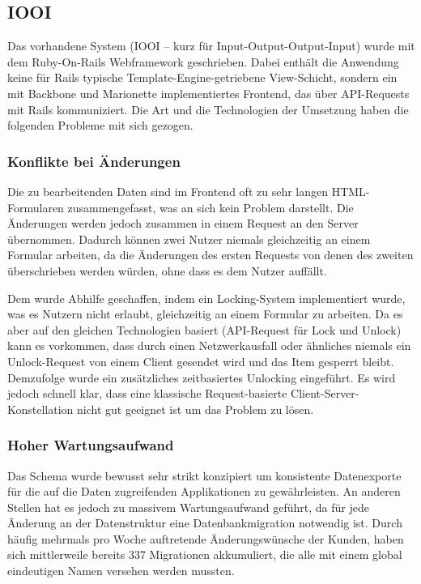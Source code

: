 \subsection{IOOI}
\label{ssec:ep_iooi}

Das vorhandene System (IOOI -- kurz für Input-Output-Output-Input) wurde mit
dem Ruby-On-Rails Webframework geschrieben.  Dabei enthält die Anwendung keine
für Rails typische Template-Engine-getriebene View-Schicht, sondern ein mit
Backbone und Marionette \cite{marionette} implementiertes Frontend, das über
API-Requests mit Rails kommuniziert.  Die Art und die Technologien der Umsetzung
haben die folgenden Probleme mit sich gezogen.

\subsubsection{Konflikte bei Änderungen}
\label{sssec:epv_konflikte_bei_aenderungen}

Die zu bearbeitenden Daten sind im Frontend oft zu sehr langen HTML-Formularen
zusammengefasst, was an sich kein Problem darstellt.  Die Änderungen werden
jedoch zusammen in einem Request an den Server übernommen.  Dadurch können zwei
Nutzer niemals gleichzeitig an einem Formular arbeiten, da die Änderungen des
ersten Requests von denen des zweiten überschrieben werden würden, ohne dass es
dem Nutzer auffällt.

Dem wurde Abhilfe geschaffen, indem ein Locking-System implementiert wurde, was
es Nutzern nicht erlaubt, gleichzeitig an einem Formular zu arbeiten.  Da es
aber auf den gleichen Technologien basiert (API-Request für Lock und Unlock)
kann es vorkommen, dass durch einen Netzwerkausfall oder ähnliches niemals ein
Unlock-Request von einem Client gesendet wird und das Item gesperrt bleibt.
Demzufolge wurde ein zusätzliches zeitbasiertes Unlocking eingeführt.  Es wird
jedoch schnell klar, dass eine klassische Request-basierte
Client-Server-Konstellation nicht gut geeignet ist um das Problem zu lösen.

\subsubsection{Hoher Wartungsaufwand}
\label{sssec:epv_hoher_wartungsaufwand}

Das Schema wurde bewusst sehr strikt konzipiert um konsistente Datenexporte für
die auf die Daten zugreifenden Applikationen zu gewährleisten.  An anderen
Stellen hat es jedoch zu massivem Wartungsaufwand geführt, da für jede Änderung
an der Datenstruktur eine Datenbankmigration notwendig ist.  Durch häufig
mehrmals pro Woche auftretende Änderungswünsche der Kunden, haben sich
mittlerweile bereits 337 Migrationen akkumuliert, die alle mit einem global
eindeutigen Namen versehen werden mussten.

